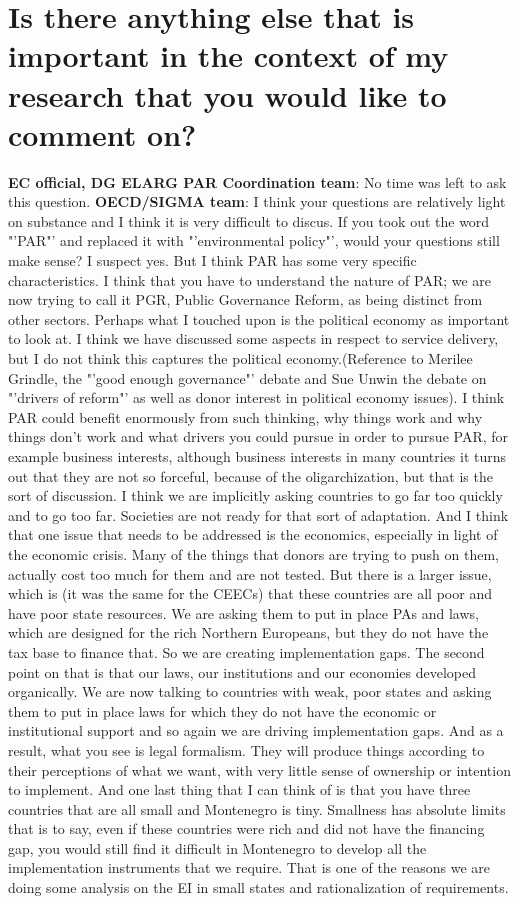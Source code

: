 \section{Is there anything else that is important in the context of my research that you would like to comment on? }
\textbf{EC official, DG ELARG PAR Coordination team}: No time was left to ask this question.
\textbf{OECD/SIGMA team}: I think your questions are relatively light on substance and I think it is very difficult to discus. If you took out the word "'PAR"' and replaced it with "'environmental policy"', would your questions still make sense? I suspect yes. But I think PAR has some very specific characteristics. I think that you have to understand the nature of PAR; we are now trying to call it PGR, Public Governance Reform, as being distinct from other sectors. Perhaps what I touched upon is the political economy as important to look at. I think we have discussed some aspects in respect to service delivery, but I do not think this captures the political economy.(Reference to Merilee Grindle, the "'good enough governance"' debate and Sue Unwin the debate on "'drivers of reform"' as well as donor interest in political economy issues). I think PAR could benefit enormously from such thinking, why things work and why things don't work and what drivers you could pursue in order to pursue PAR, for example business interests, although business interests in many countries it turns out that they are not so forceful, because of the oligarchization, but that is the sort of discussion. I think we are implicitly asking countries to go far too quickly and to go too far. Societies are not ready for that sort of adaptation. And I think that one issue that needs to be addressed is the economics, especially in light of the economic crisis. Many of the things that donors are trying to push on them, actually cost too much for them and are not tested. But there is a larger issue, which is (it was the same for the CEECs) that these countries are all poor and have poor state resources. We are asking them to put in place PAs and laws, which are designed for the rich Northern Europeans, but they do not have the tax base to finance that. So we are creating implementation gaps. The second point on that is that our laws, our institutions and our economies developed organically. We are now talking to countries with weak, poor states and asking them to put in place laws for which they do not have the economic or institutional support and so again we are driving implementation gaps. And as a result, what you see is legal formalism. They will produce things according to their perceptions of what we want, with very little sense of ownership or intention to implement. And one last thing that I can think of is that you have three countries that are all small and Montenegro is tiny. Smallness has absolute limits that is to say, even if these countries were rich and did not have the financing gap, you would still find it difficult in Montenegro to develop all the implementation instruments that we require. That is one of the reasons we are doing some analysis on the EI in small states and rationalization of requirements.\\ 

